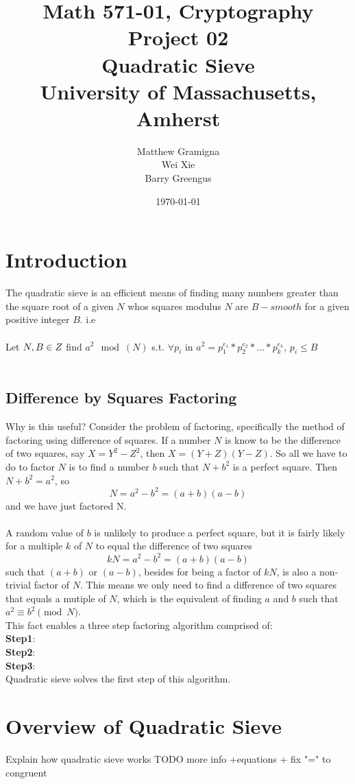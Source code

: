 \documentclass[titlepage]{article}
\title{Math 571-01, Cryptography Project 02 \\ Quadratic Sieve \\ University of Massachusetts, Amherst}
\author{Matthew Gramigna \\ Wei Xie \\ Barry Greengus}
\date{\today}
\begin{document}
	
	\maketitle
	
	\section{Introduction}
	The quadratic sieve is an efficient means of finding many numbers greater than the square root of a given $N$ whos squares modulus $N$ are $B-smooth$ for a given positive integer $B$. i.e\\
	\\
	Let $N,B\in{Z}\\
	$ find $a^2 \mod(N)$ s.t. $\forall p_i $ in $a^2 = p^{e_1}_1*p^{e_2}_2*...*p^{e_k}_k$, $p_i \leq B$\\
	\\
	\subsection{Difference by Squares Factoring}
	Why is this useful? Consider the problem of factoring, specifically the method of factoring using difference of squares. If a number $N$ is know to be the difference of two squares, say $X = Y^2 - Z^2$, then $X = (Y+Z) (Y-Z)$. So all we have to do to factor $N$ is to find a number $b$ such that $N + b^2$ is a perfect square. Then $N + b^2 = a^2$, so \[N = a^2 - b^2 = (a+b)(a-b)\] and we have just factored N.\\
	\\
	A random value of $b$ is unlikely to produce a perfect square, but it is fairly likely for a multiple $k$ of $N$ to equal the difference of two squares \[kN = a^2 - b^2 = (a+b)(a-b)\] such that $(a+b)$ or $(a-b)$, besides for being a factor of $kN$, is also a non-trivial factor of $N$. This means we only need to find a difference of two squares that equals a mutiple of $N$, which is the equivalent of finding $a$ and $b$ such that $a^2\equiv b^2 \pmod{N}$.
	\\
	This fact enables a three step factoring algorithm comprised of:\\
	\textbf{Step1}:\\
	\textbf{Step2}: \\
	\textbf{Step3}: \\
	
	Quadratic sieve solves the first step of this algorithm.

	\section{Overview of Quadratic Sieve}
	Explain how quadratic sieve works TODO more info +equations + fix "=" to congruent
\end{document}
